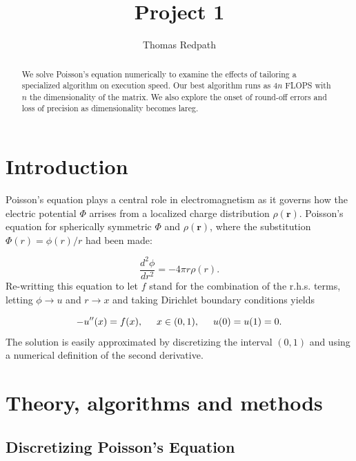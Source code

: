 \documentclass[10pt,showpacs,preprintnumbers,footinbib,amsmath,amssymb,aps,prl,twocolumn,groupedaddress,superscriptaddress,showkeys]{revtex4-1}
\newcommand{\deriv}[3][]{%
	\ensuremath{ \frac{d^{#1} {#2}}{d {#3}^{#1}} } }
\begin{document}
\title{Project 1}
\author{Thomas Redpath}
\begin{abstract}

We solve Poisson's equation numerically to examine the effects of tailoring a specialized algorithm on execution speed.
Our best algorithm runs as $4n$ FLOPS with $n$ the dimensionality of the matrix. We also explore the onset of
round-off errors and loss of precision as dimensionality becomes lareg.

\end{abstract}
\maketitle

\section{Introduction}

Poisson's equation plays a central role in electromagnetism as it governs how the electric potential $\Phi$ arrises from a
localized charge distribution $\rho (\mathbf{r})$. Poisson's equation for spherically symmetric $\Phi$ and $\rho (\mathbf{r})$,
where the substitution $\Phi(r) = \phi(r)/r$ had been made:

\begin{equation*}
	\deriv[2]{\phi}{r}= -4\pi r\rho(r).
\end{equation*}
Re-writting this equation to let $f$ stand for the combination of the r.h.s. terms, letting $\phi \rightarrow u$ and
$r \rightarrow x$ and taking Dirichlet boundary conditions yields

\begin{equation*}
	-u''(x) = f(x), \hspace{0.5cm} x\in(0,1), \hspace{0.5cm} u(0) = u(1) = 0.
\end{equation*}
The solution is easily approximated by discretizing the interval $(0,1)$ and using a numerical definition of the second
derivative.

\section{Theory, algorithms and methods}

\subsection{Discretizing Poisson's Equation}
\end{document}
